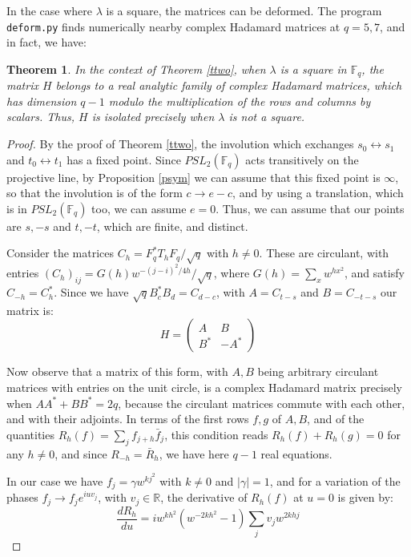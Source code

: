 \documentclass[11pt]{amsart}
\newtheorem{theorem}{Theorem}[section]
\theoremstyle{definition}
\begin{document}
In the case where $\lambda$ is a square, the matrices can be deformed. The program {\tt deform.py} finds numerically nearby complex Hadamard matrices at $q=5,7$, and in fact, we have:

\begin{theorem}\label{tsq}
In the context of Theorem \ref{ttwo}, when $\lambda$ is a square in $\mathbb F_q$, the matrix $H$ belongs to a real analytic family of complex Hadamard matrices, which has dimension $q-1$ modulo the multiplication of the rows and columns by scalars. Thus, $H$ is isolated precisely when $\lambda$ is not a square.
\end{theorem}

\begin{proof}
By the proof of Theorem \ref{ttwo}, the involution which exchanges $s_0\leftrightarrow s_1$ and $t_0\leftrightarrow t_1$ has a fixed point. Since $PSL_2(\mathbb F_q)$ acts transitively on the projective line, by Proposition \ref{psym} we can assume that this fixed point is $\infty$, so that the involution is of the form $c\to e-c$, and by using a translation, which is in $PSL_2(\mathbb F_q)$ too, we can assume $e=0$. Thus, we can assume that our points are $s,-s$ and $t,-t$, which are finite, and distinct.

\medskip

Consider the matrices $C_h=F_q^*T_hF_q/\sqrt{q}$ with $h\neq0$. These are circulant, with entries $(C_h)_{ij}=G(h)w^{-(j-i)^2/4h}/\sqrt{q}$, where $G(h)=\sum_xw^{hx^2}$, and satisfy $C_{-h}=C_h^*$. Since we have $\sqrt{q}B_c^*B_d=C_{d-c}$, with $A=C_{t-s}$ and $B=C_{-t-s}$ our matrix is:
$$H=\begin{pmatrix}A&B\\B^*&-A^*\end{pmatrix}$$

Now observe that a matrix of this form, with $A,B$ being arbitrary circulant matrices with entries on the unit circle, is a complex Hadamard matrix precisely when $AA^*+BB^*=2q$, because the circulant matrices commute with each other, and with their adjoints. In terms of the first rows $f,g$ of $A,B$, and of the quantities $R_h(f)=\sum_jf_{j+h}\bar{f}_j$, this condition reads $R_h(f)+R_h(g)=0$ for any $h\neq0$, and since $R_{-h}=\bar{R}_h$, we have here $q-1$ real equations.

\medskip

In our case we have $f_j=\gamma w^{kj^2}$ with $k\neq0$ and $|\gamma|=1$, and for a variation of the phases $f_j\to f_je^{iuv_j}$, with $v_j\in\mathbb R$, the derivative of $R_h(f)$ at $u=0$ is given by:
$$\frac{dR_h}{du}=iw^{kh^2}(w^{-2kh^2}-1)\sum_jv_jw^{2khj}$$


\end{proof}
\end{document}
